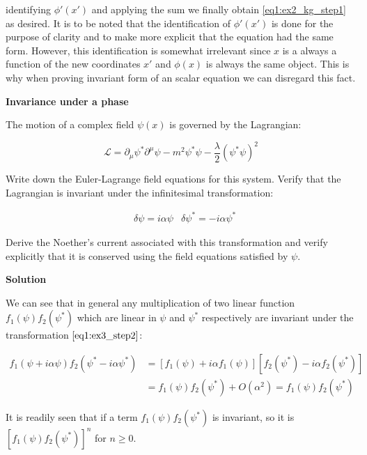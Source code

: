 identifying $\phi'(x')$ and applying the sum we finally obtain \ref{eq1:ex2_kg_step1} as desired. It is to be noted that the identification of $\phi'(x')$ is done for the purpose of clarity and to make more explicit that the equation had the same form. However, this identification is somewhat irrelevant since $x$ is a always a function of the new coordinates $x'$ and $\phi(x)$ is always the same object. This is why when proving invariant form of an scalar equation we can disregard this fact.


\item \textbf{Invariance under a phase}

The motion of a complex field $\psi(x)$ is governed by the Lagrangian:

\begin{equation}
\mathcal{L} = \partial_{\mu}\psi^{*}\partial^{\mu}\psi - m^2\psi^{*}\psi - \frac{\lambda}{2}(\psi^{*}\psi)^2
\label{eq1:ex3_step1}
\end{equation}

Write down the Euler-Lagrange field equations for this system. Verify that the Lagrangian is invariant under the infinitesimal transformation:

\begin{align}
&\delta\psi = i \alpha \psi & \delta\psi^{*}= -i \alpha \psi^{*}
\label{eq1:ex3_step2}
\end{align}

Derive the Noether's current associated with this transformation and verify explicitly
that it is conserved using the field equations satisfied by $\psi$.

\textbf{Solution}

We can see that in general any multiplication of two linear function $f_1(\psi)f_2(\psi^{*})$ which are linear in $\psi$ and $\psi^{*}$ respectively are invariant under the transformation $\ref{eq1:ex3_step2}$:

\begin{equation}
\begin{aligned} \label{eq1:ex3_step3}
f_1(\psi +i \alpha \psi)f_2(\psi^{*} -i \alpha \psi^{*}) &= [f_1(\psi) + i \alpha f_1(\psi)][f_2(\psi^{*}) -i \alpha f_2(\psi^{*})] \\ 
&= f_1(\psi)f_2(\psi^{*}) + O(\alpha^2) = f_1(\psi)f_2(\psi^{*}) 
\end{aligned}
\end{equation}

It is readily seen that if a term $f_1(\psi)f_2(\psi^{*})$ is invariant, so it is $[f_1(\psi)f_2(\psi^{*})]^n$ for $n \ge 0$.\\

